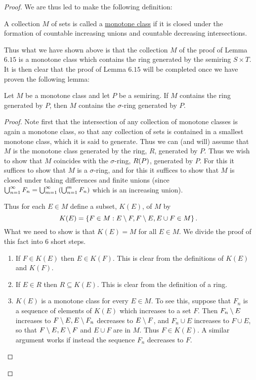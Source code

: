 \begin{proof}
We are thus led to make the following definition:

\begin{definition}
A collection $M$ of sets is called a \underline{monotone class} if it is closed under the formation of countable increasing unions and countable decreasing intersections.
\end{definition}

Thus what we have shown above is that the collection $M$ of the proof of Lemma $6.15$ is a monotone class which contains the ring generated by the semiring $S\times T$. It is then clear that the proof of Lemma $6.15$ will be completed once we have proven the following lemma:

\begin{lemma}
Let $M$ be a monotone class and let $P$ be a semiring. If $M$ contains the ring generated by $P$, then $M$ contains the $\sigma$-ring generated by $P$.
\end{lemma}

\begin{proof}
Note first that the intersection of any collection of monotone classes is again a monotone class, so that any collection of sets is contained in a smallest monotone class, which it is said to generate. Thus we can (and will) assume that $M$ is the monotone class generated by the ring, $R$, generated by $P$. Thus we wish to show that $M$ coincides with the $\sigma$-ring, $R(P)$, generated by $P$. For this it suffices to show that $M$ is a $\sigma$-ring, and for this it suffices to show that $M$ is closed under taking differences and finite unions (since $\bigcup_{n=1}^\infty F_n=\bigcup_{m=1}^\infty\left(\bigcup_{n=1}^mF_n\right)$ which is an increasing union).

Thus for each $E\in M$ define a subset, $K(E)$, of $M$ by $$K(E)=\left\{F\in M: E\setminus F, F\setminus E,E\cup F\in M\right\}.$$ %
What we need to show is that $K(E)=M$ for all $E\in M$. We divide the proof of this fact into 6 short steps.
\begin{enumerate}[label=\arabic*)]
    \item If $F\in K(E)$ then $E\in K(F)$. This is clear from the definitions of $K(E)$ and $K(F)$.
    
    \item If $E\in R$ then $R\subseteq K(E)$. This is clear from the definition of a ring.
    
    \item $K(E)$ is a monotone class for every $E\in M$. To see this, suppose that $F_n$ is a sequence of elements of $K(E)$ which increases to a set $F$. Then $F_n\setminus E$ increases to $F\setminus E, E\setminus F_n$ decreases to $E\setminus F$, and $F_n\cup E$ increases to $F\cup E$, so that $F\setminus E, E\setminus F$ and $E\cup F$ are in $M$. Thus $F\in K(E)$. A similar argument works if instead the sequence $F_n$ decreases to $F$.


\end{enumerate}
\end{proof}
\end{proof}
